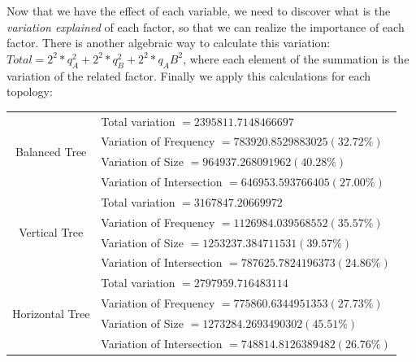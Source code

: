 Now that we have the effect of each variable, we need to discover what is the \emph{variation explained} of each factor, so that we can realize the importance of each factor. There is another algebraic way to calculate this variation: $Total = 2^2 * q _A ^2 + 2^2 * q _B ^2 + 2^2 * q _AB ^2  $, where each element of the summation is the variation of the related factor. Finally we apply this calculations for each topology:

\begin{center}
	\begin{tabular}{ | c | l | }
		\hline
		\multirow{4}{*}{Balanced Tree}& Total variation $= 2395811.7148466697$ \\
		                              & Variation of Frequency $= 783920.8529883025 (32.72\%)$ \\
		                              & Variation of Size $= 964937.268091962 (40.28\%)$ \\
		                              & Variation of Intersection $= 646953.593766405 (27.00\%)$\\
		
		\hline
		\multirow{4}{*}{Vertical Tree} & Total variation $= 3167847.20669972$ \\
		                               & Variation of Frequency $= 1126984.039568552 (35.57\%)$ \\
		                               & Variation of Size $= 1253237.384711531 (39.57\%)$ \\
		                               & Variation of Intersection $= 787625.7824196373 (24.86\%)$\\ 
		
		\hline
		\multirow{4}{*}{Horizontal Tree} & Total variation $= 2797959.716483114$ \\
		                                 & Variation of Frequency $= 775860.6344951353 (27.73\%)$ \\
		                                 & Variation of Size $= 1273284.2693490302 (45.51\%)$ \\
		                                 & Variation of Intersection $= 748814.8126389482 (26.76\%)$\\
		\hline
	\end{tabular}
\end{center}


